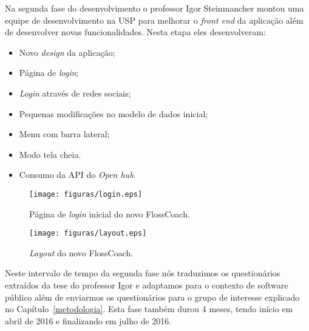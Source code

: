 Na segunda fase do desenvolvimento o professor Igor Steinmancher montou uma equipe 
de desenvolvimento na USP para melhorar o \textit{front end} da aplicação além
de desenvolver novas funcionalidades. Nesta etapa eles desenvolveram:
\begin{itemize}
\item Novo \textit{design} da aplicação;
\item Página de \textit{login}; 
\item \textit{Login} através de redes sociais;
\item Pequenas modificações no modelo de dados inicial;
\item Menu com barra lateral;
\item Modo tela cheia.
\item Consumo da API do \textit{Open hub}.
\end{itemize}

\begin{figure}[h]
	\centering
	\label{fig:prototipo}
		\texttt{[image: figuras/login.eps]}
	\caption{Página de \textit{login} inicial do novo FlossCoach.}
\end{figure}


\begin{figure}[h]
	\centering
	\label{fig:prototipo}
		\texttt{[image: figuras/layout.eps]}
	\caption{\textit{Layout} do novo FlossCoach.}
\end{figure}


Neste intervalo de tempo da segunda fase nós traduzimos os questionários extraídos
da tese do professor Igor e adaptamos para o contexto de software público além de 
enviarmos os questionários para o grupo de interesse explicado no Capítulo~\ref{metodologia}.
Esta fase também durou 4 meses, tendo início em abril de 2016 e finalizando em julho de 2016.



